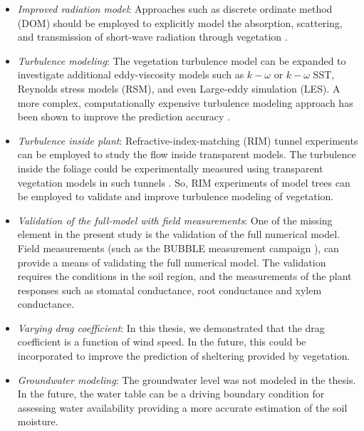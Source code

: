 \begin{itemize}
	\item \textit{Improved radiation model}: Approaches such as discrete ordinate method (DOM) should be employed to explicitly model the absorption, scattering, and transmission of short-wave radiation through vegetation \citep{Gastellu-Etchegorry1996,Bailey2014,Sinoquet2001}.
	
	\item \textit{Turbulence modeling}: The vegetation turbulence model can be expanded to investigate additional eddy-viscosity models such as $k-\omega$ or $k-\omega$ SST, Reynolds stress models (RSM), and even Large-eddy simulation (LES). A more complex, computationally expensive turbulence modeling approach has been shown to improve the prediction accuracy \citep{Hiraoka2011,Yue2008,Lopes2013}.

	\item \textit{Turbulence inside plant}: Refractive-index-matching (RIM) tunnel experiments can be employed to study the flow inside transparent models. The turbulence inside the foliage could be experimentally measured using transparent vegetation models in such tunnels \citep{Weitzman2014, Harshani2017,Bai2014a,Bai2012}. So, RIM experiments of model trees can be employed to validate and improve turbulence modeling of vegetation.
	
	\item \textit{Validation of the full-model with field measurements}: One of the missing element in the present study is the validation of the full numerical model. Field measurements (such as the BUBBLE measurement campaign \citep{Rotach2005}), can provide a means of validating the full numerical model. The validation requires the conditions in the soil region, and the measurements of the plant responses such as stomatal conductance, root conductance and xylem conductance. 
	
	\item \textit{Varying drag coefficient}: In this thesis, we demonstrated that the drag coefficient is a function of wind speed. In the future, this could be incorporated to improve the prediction of sheltering provided by vegetation. 
	
	\item \textit{Groundwater modeling}: The groundwater level was not modeled in the thesis. In the future, the water table can be a driving boundary condition for assessing water availability providing a more accurate estimation of the soil moisture. 
	

\end{itemize}
